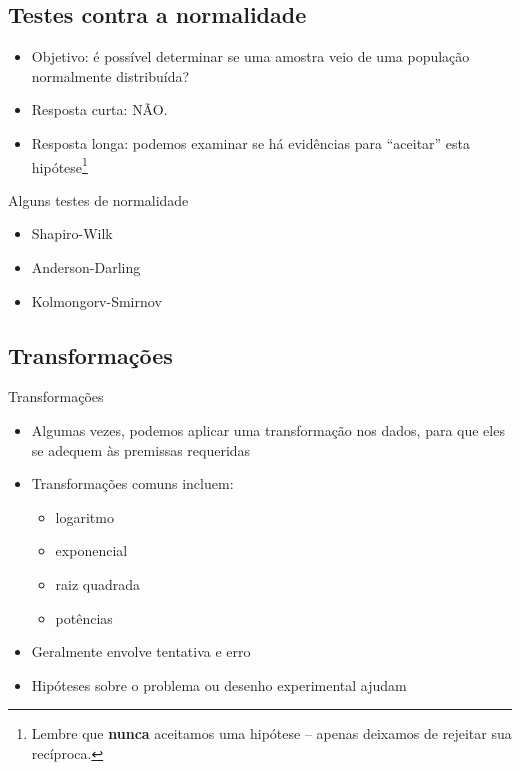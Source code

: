 \documentclass{beamer}
\begin{document}
\subsection[Normalidade]{Testes contra a normalidade}

\begin{frame}
  \begin{itemize}
  \item Objetivo: é possível \alert{determinar} se uma amostra veio de uma população normalmente distribuída?
  \item Resposta curta: \alert<3->{NÃO}.
  \item<4> Resposta longa: podemos examinar se há evidências para ``aceitar'' esta hipótese\footnote{Lembre que {\bf nunca} aceitamos uma hipótese -- apenas deixamos de rejeitar sua recíproca.}
  \end{itemize}
\end{frame}

\begin{frame}{Alguns testes de normalidade}
  \begin{itemize}
  \item<1-> \alert<2>{Shapiro-Wilk}
  \item<1-> Anderson-Darling
  \item<1-> Kolmongorv-Smirnov
  \end{itemize}
\end{frame}

\subsection{Transformações}

\begin{frame}{Transformações}
  \begin{itemize}
  \item Algumas vezes, podemos aplicar uma transformação nos dados, para que eles se adequem às premissas requeridas
  \item Transformações comuns incluem:
    \begin{itemize}
    \item logaritmo
    \item exponencial
    \item raiz quadrada
    \item potências
    \end{itemize}
  \item Geralmente envolve tentativa e erro
  \item Hipóteses sobre o problema ou desenho experimental ajudam
  \end{itemize}
\end{frame}
\end{document}
